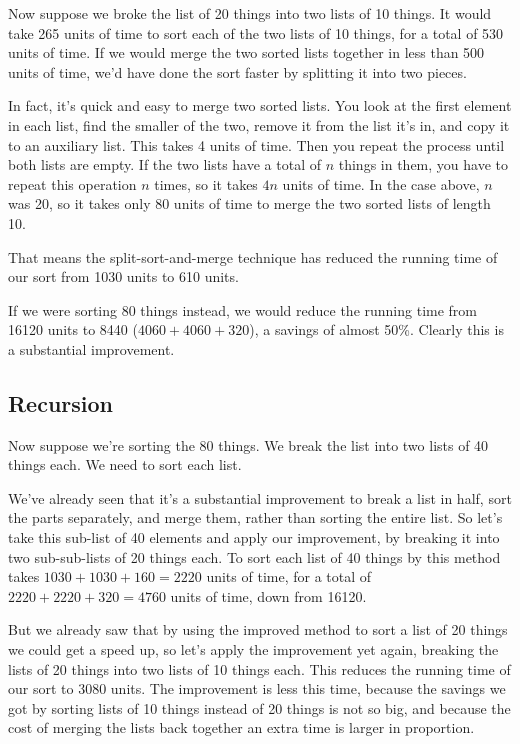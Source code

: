Now suppose we broke the list of 20 things into two lists of 10 things.
It would take 265 units of time to sort each of the two lists of 10
things, for a total of 530 units of time.  If we would merge the two
sorted lists together in less than 500 units of time, we'd have
done the sort faster by splitting it into two pieces.

In fact, it's quick and easy to merge two sorted lists.  You look at the
first element in each list, find the smaller of the two, remove it from
the list it's in, and copy it to an auxiliary list.  This takes 4 units
of time.  Then you repeat the process until both lists are empty.  If
the two lists have a total of $n$ things in them, you have to repeat
this operation $n$ times, so it takes $4n$ units of time.  In the case
above, $n$ was 20, so it takes only 80 units of time to merge the two
sorted lists of length 10.  

That means the split-sort-and-merge technique has reduced the running
time of our sort from 1030 units to 610 units.  

If we were sorting 80 things instead, we would reduce the running time
from 16120 units to 8440 ($4060+4060+320$), a savings of almost 50\%.
Clearly this is a substantial improvement.

\subsection{Recursion}

Now suppose we're sorting the 80 things.  We break the list into two
lists of 40 things each.  We need to sort each list.

We've already seen that it's a substantial improvement to break a list
in half, sort the parts separately, and merge them, rather than sorting
the entire list.  So let's take this sub-list of 40 elements and apply
our improvement, by breaking it into two sub-sub-lists of 20 things
each.  To sort each list of 40 things by this method takes
$1030+1030+160 = 2220$ units of time, for a total of $2220+2220+320 =
4760$ units of time, down from 16120.  

But we already saw that by using the improved method to sort a list of
20 things we could get a speed up, so let's apply the improvement yet
again, breaking the lists of 20 things into two lists of 10 things each.
This reduces the running time of our sort to 3080 units.  The
improvement is less this time, because the savings we got by sorting
lists of 10 things instead of 20 things is not so big, and because the
cost of merging the lists back together an extra time is larger in
proportion.  

